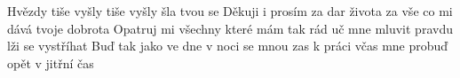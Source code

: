 \begin{TEXT}{Hvězdy tiše vyšly}
\SLOKA {} tiše vyšly  šla  \NL
{} tvou   se  
\SLOKA Děkuji i prosím za dar života \NL
za vše co mi dává tvoje dobrota 
\SLOKA Opatruj mi všechny které mám tak rád \NL
uč mne mluvit pravdu lži se vystříhat 
\SLOKA Buď tak jako ve dne v noci se mnou zas \NL
k práci včas mne probuď opět v jitřní čas \NL
\end{TEXT}
